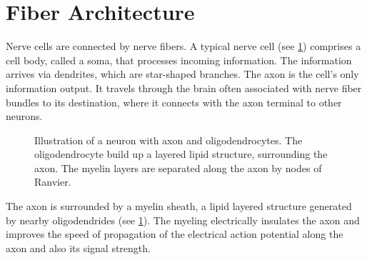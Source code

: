 \section{Fiber Architecture} \label{sec:fiberArchitecture}
%
Nerve cells are connected by nerve fibers.
A typical nerve cell (see \cref{fig:CortexAndNerveCell}) comprises a cell body, called a soma, that processes incoming information.
The information arrives via dendrites, which are star-shaped branches.
The axon is the cell's only information output.
It travels through the brain often associated with nerve fiber bundles to its destination, where it connects with the axon terminal to other neurons.
\par
%
\begin{figure}[!t]
\setlength{\tikzwidth}{0.75\textwidth}
\centering
\tikzset{external/export next=false}
\caption{Illustration of a neuron with axon and oligodendrocytes.
    The oligodendrocyte build up a layered lipid structure, surrounding the axon.
    The myelin layers are separated along the axon by nodes of Ranvier.}
\label{fig:CortexAndNerveCell}
\end{figure}
%
The axon is surrounded by a myelin sheath, a lipid layered structure generated by nearby oligodendrides (see \cref{fig:CortexAndNerveCell}).
The myeling electrically insulates the axon and improves the speed of propagation of the electrical action potential along the axon and also its signal strength.
